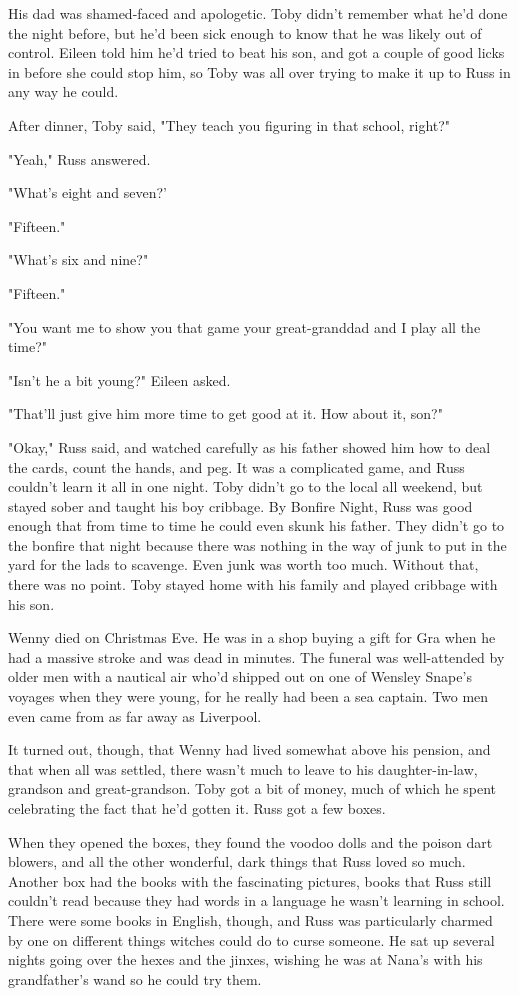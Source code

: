 \documentclass[a4paper,11pt]{article}
\begin{document}
His dad was shamed-faced and apologetic. Toby didn't remember what he'd done the night before, but he'd been sick enough to know that he was likely out of control. Eileen told him he'd tried to beat his son, and got a couple of good licks in before she could stop him, so Toby was all over trying to make it up to Russ in any way he could.

After dinner, Toby said, "They teach you figuring in that school, right?"

"Yeah," Russ answered.

"What's eight and seven?'

"Fifteen."

"What's six and nine?"

"Fifteen."

"You want me to show you that game your great-granddad and I play all the time?"

"Isn't he a bit young?" Eileen asked.

"That'll just give him more time to get good at it. How about it, son?"

"Okay," Russ said, and watched carefully as his father showed him how to deal the cards, count the hands, and peg. It was a complicated game, and Russ couldn't learn it all in one night. Toby didn't go to the local all weekend, but stayed sober and taught his boy cribbage. By Bonfire Night, Russ was good enough that from time to time he could even skunk his father. They didn't go to the bonfire that night because there was nothing in the way of junk to put in the yard for the lads to scavenge. Even junk was worth too much. Without that, there was no point. Toby stayed home with his family and played cribbage with his son.

Wenny died on Christmas Eve. He was in a shop buying a gift for Gra when he had a massive stroke and was dead in minutes. The funeral was well-attended by older men with a nautical air who'd shipped out on one of Wensley Snape's voyages when they were young, for he really had been a sea captain. Two men even came from as far away as Liverpool.

It turned out, though, that Wenny had lived somewhat above his pension, and that when all was settled, there wasn't much to leave to his daughter-in-law, grandson and great-grandson. Toby got a bit of money, much of which he spent celebrating the fact that he'd gotten it. Russ got a few boxes.

When they opened the boxes, they found the voodoo dolls and the poison dart blowers, and all the other wonderful, dark things that Russ loved so much. Another box had the books with the fascinating pictures, books that Russ still couldn't read because they had words in a language he wasn't learning in school. There were some books in English, though, and Russ was particularly charmed by one on different things witches could do to curse someone. He sat up several nights going over the hexes and the jinxes, wishing he was at Nana's with his grandfather's wand so he could try them.
\end{document}
